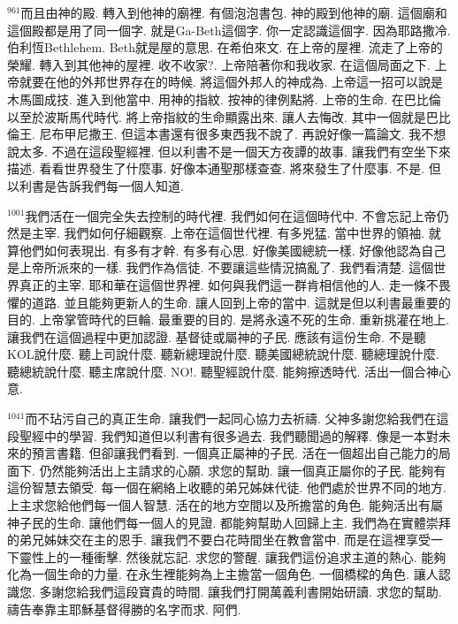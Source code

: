\documentclass{book}
\begin{document}
$^{961}$而且由神的殿.
轉入到他神的廟裡.
有個泡泡書包.
神的殿到他神的廟.
這個廟和這個殿都是用了同一個字.
就是Ga-Beth這個字.
你一定認識這個字.
因為耶路撒冷.
伯利恆Bethlehem.
Beth就是屋的意思.
在希伯來文.
在上帝的屋裡.
流走了上帝的榮耀.
轉入到其他神的屋裡.
收不收家?.
上帝陪著你和我收家.
在這個局面之下.
上帝就要在他的外邦世界存在的時候.
將這個外邦人的神成為.
上帝這一招可以說是木馬圖成技.
進入到他當中.
用神的指紋.
按神的律例點將.
上帝的生命.
在巴比倫以至於波斯馬代時代.
將上帝指紋的生命顯露出來.
讓人去悔改.
其中一個就是巴比倫王.
尼布甲尼撒王.
但這本書還有很多東西我不說了.
再說好像一篇論文.
我不想說太多.
不過在這段聖經裡.
但以利書不是一個天方夜譚的故事.
讓我們有空坐下來描述.
看看世界發生了什麼事.
好像本通聖那樣查查.
將來發生了什麼事.
不是.
但以利書是告訴我們每一個人知道.

$^{1001}$我們活在一個完全失去控制的時代裡.
我們如何在這個時代中.
不會忘記上帝仍然是主宰.
我們如何仔細觀察.
上帝在這個世代裡.
有多兇猛.
當中世界的領袖.
就算他們如何表現出.
有多有才幹.
有多有心思.
好像美國總統一樣.
好像他認為自己是上帝所派來的一樣.
我們作為信徒.
不要讓這些情況搞亂了.
我們看清楚.
這個世界真正的主宰.
耶和華在這個世界裡.
如何與我們這一群肯相信他的人.
走一條不畏懼的道路.
並且能夠更新人的生命.
讓人回到上帝的當中.
這就是但以利書最重要的目的.
上帝掌管時代的巨輪.
最重要的目的.
是將永遠不死的生命.
重新挑灌在地上.
讓我們在這個過程中更加認證.
基督徒或屬神的子民.
應該有這份生命.
不是聽KOL說什麼.
聽上司說什麼.
聽新總理說什麼.
聽美國總統說什麼.
聽總理說什麼.
聽總統說什麼.
聽主席說什麼.
NO!.
聽聖經說什麼.
能夠擦透時代.
活出一個合神心意.

$^{1041}$而不玷污自己的真正生命.
讓我們一起同心協力去祈禱.
父神多謝您給我們在這段聖經中的學習.
我們知道但以利書有很多過去.
我們聽聞過的解釋.
像是一本對未來的預言書籍.
但卻讓我們看到.
一個真正屬神的子民.
活在一個超出自己能力的局面下.
仍然能夠活出上主請求的心願.
求您的幫助.
讓一個真正屬你的子民.
能夠有這份智慧去領受.
每一個在網絡上收聽的弟兄姊妹代徒.
他們處於世界不同的地方.
上主求您給他們每一個人智慧.
活在的地方空間以及所擔當的角色.
能夠活出有屬神子民的生命.
讓他們每一個人的見證.
都能夠幫助人回歸上主.
我們為在實體崇拜的弟兄姊妹交在主的恩手.
讓我們不要白花時間坐在教會當中.
而是在這裡享受一下靈性上的一種衝擊.
然後就忘記.
求您的警醒.
讓我們這份追求主道的熱心.
能夠化為一個生命的力量.
在永生裡能夠為上主擔當一個角色.
一個橋樑的角色.
讓人認識您.
多謝您給我們這段寶貴的時間.
讓我們打開萬義利書開始研讀.
求您的幫助.
禱告奉靠主耶穌基督得勝的名字而求.
阿們.
\newpage
\end{document}
